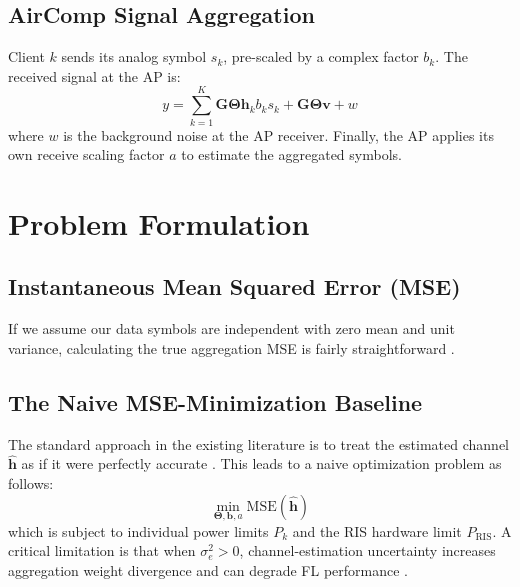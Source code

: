 \documentclass[journal, twocolumn]{IEEEtran}
\begin{document}
\subsection{AirComp Signal Aggregation}
Client $k$ sends its analog symbol $s_k$, pre-scaled by a complex factor $b_k$. The received signal at the AP is:
\begin{equation}
    y = \sum_{k=1}^K \mathbf{G} \mathbf{\Theta} \mathbf{h}_k b_k s_k + \mathbf{G} \mathbf{\Theta} \mathbf{v} + w
\end{equation}
where $w$ is the background noise at the AP receiver. Finally, the AP applies its own receive scaling factor $a$ to estimate the aggregated symbols.

\section{Problem Formulation}

\subsection{Instantaneous Mean Squared Error (MSE)}
If we assume our data symbols are independent with zero mean and unit variance, calculating the true aggregation MSE is fairly straightforward \cite{liu2020over}.

\subsection{The Naive MSE-Minimization Baseline}
The standard approach in the existing literature is to treat the estimated channel $\hat{\mathbf{h}}$ as if it were perfectly accurate \cite{al2023ris}. This leads to a naive optimization problem as follows:
\begin{equation}
    \min_{\mathbf{\Theta}, \mathbf{b}, a} \text{MSE}(\hat{\mathbf{h}})
\end{equation}
which is subject to individual power limits $P_k$ and the RIS hardware limit $P_{\text{RIS}}$. A critical limitation is that when $\sigma_e^2 > 0$, channel-estimation uncertainty increases aggregation weight divergence and can degrade FL performance \cite{yao2023robust}.
\end{document}
